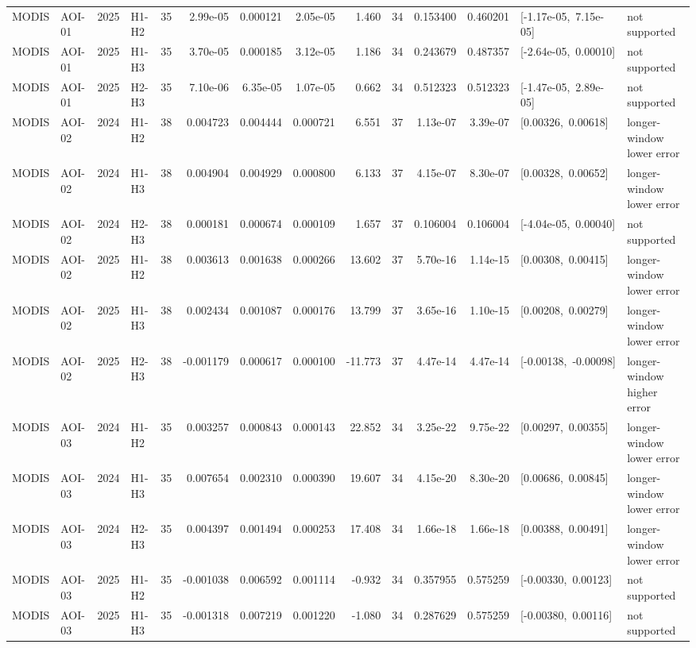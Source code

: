 \begin{longtable}{llclrrrrrrrrp{2.35cm}p{1.75cm}}
MODIS & AOI-01 & 2025 & H1-H2 & 35 & 2.99e-05 & 0.000121 & 2.05e-05 & 1.460 & 34 & 0.153400 & 0.460201 & \mbox{[-1.17e-05, 7.15e-05]} & not supported \\
MODIS & AOI-01 & 2025 & H1-H3 & 35 & 3.70e-05 & 0.000185 & 3.12e-05 & 1.186 & 34 & 0.243679 & 0.487357 & \mbox{[-2.64e-05, 0.00010]} & not supported \\
MODIS & AOI-01 & 2025 & H2-H3 & 35 & 7.10e-06 & 6.35e-05 & 1.07e-05 & 0.662 & 34 & 0.512323 & 0.512323 & \mbox{[-1.47e-05, 2.89e-05]} & not supported \\
MODIS & AOI-02 & 2024 & H1-H2 & 38 & 0.004723 & 0.004444 & 0.000721 & 6.551 & 37 & 1.13e-07 & 3.39e-07 & \mbox{[0.00326, 0.00618]} & longer-window lower error \\
MODIS & AOI-02 & 2024 & H1-H3 & 38 & 0.004904 & 0.004929 & 0.000800 & 6.133 & 37 & 4.15e-07 & 8.30e-07 & \mbox{[0.00328, 0.00652]} & longer-window lower error \\
MODIS & AOI-02 & 2024 & H2-H3 & 38 & 0.000181 & 0.000674 & 0.000109 & 1.657 & 37 & 0.106004 & 0.106004 & \mbox{[-4.04e-05, 0.00040]} & not supported \\
MODIS & AOI-02 & 2025 & H1-H2 & 38 & 0.003613 & 0.001638 & 0.000266 & 13.602 & 37 & 5.70e-16 & 1.14e-15 & \mbox{[0.00308, 0.00415]} & longer-window lower error \\
MODIS & AOI-02 & 2025 & H1-H3 & 38 & 0.002434 & 0.001087 & 0.000176 & 13.799 & 37 & 3.65e-16 & 1.10e-15 & \mbox{[0.00208, 0.00279]} & longer-window lower error \\
MODIS & AOI-02 & 2025 & H2-H3 & 38 & -0.001179 & 0.000617 & 0.000100 & -11.773 & 37 & 4.47e-14 & 4.47e-14 & \mbox{[-0.00138, -0.00098]} & longer-window higher error \\
MODIS & AOI-03 & 2024 & H1-H2 & 35 & 0.003257 & 0.000843 & 0.000143 & 22.852 & 34 & 3.25e-22 & 9.75e-22 & \mbox{[0.00297, 0.00355]} & longer-window lower error \\
MODIS & AOI-03 & 2024 & H1-H3 & 35 & 0.007654 & 0.002310 & 0.000390 & 19.607 & 34 & 4.15e-20 & 8.30e-20 & \mbox{[0.00686, 0.00845]} & longer-window lower error \\
MODIS & AOI-03 & 2024 & H2-H3 & 35 & 0.004397 & 0.001494 & 0.000253 & 17.408 & 34 & 1.66e-18 & 1.66e-18 & \mbox{[0.00388, 0.00491]} & longer-window lower error \\
MODIS & AOI-03 & 2025 & H1-H2 & 35 & -0.001038 & 0.006592 & 0.001114 & -0.932 & 34 & 0.357955 & 0.575259 & \mbox{[-0.00330, 0.00123]} & not supported \\
MODIS & AOI-03 & 2025 & H1-H3 & 35 & -0.001318 & 0.007219 & 0.001220 & -1.080 & 34 & 0.287629 & 0.575259 & \mbox{[-0.00380, 0.00116]} & not supported \\

\end{longtable}

